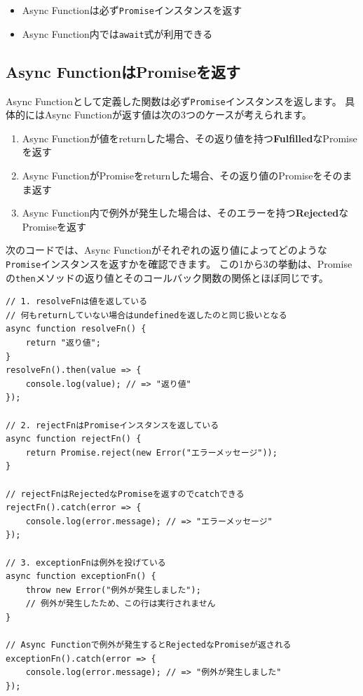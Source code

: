 \begin{itemize}
\item
  Async
  Functionは必ず\texttt{Promise}インスタンスを返す
\item
  Async Function内では\texttt{await}式が利用できる
\end{itemize}

\hypertarget{async-function-return-promise}{%
\subsection{Async
FunctionはPromiseを返す}\label{async-function-return-promise}}

Async
Functionとして定義した関数は必ず\texttt{Promise}インスタンスを返します。
具体的にはAsync Functionが返す値は次の3つのケースが考えられます。

\begin{enumerate}
\def\labelenumi{\arabic{enumi}.}
\item
  Async
  Functionが値をreturnした場合、その返り値を持つ\textbf{Fulfilled}なPromiseを返す
\item
  Async
  FunctionがPromiseをreturnした場合、その返り値のPromiseをそのまま返す
\item
  Async
  Function内で例外が発生した場合は、そのエラーを持つ\textbf{Rejected}なPromiseを返す
\end{enumerate}

次のコードでは、Async
Functionがそれぞれの返り値によってどのような\texttt{Promise}インスタンスを返すかを確認できます。
この1から3の挙動は、Promiseの\texttt{then}メソッドの返り値とそのコールバック関数の関係とほぼ同じです。

\begin{lstlisting}
// 1. resolveFnは値を返している
// 何もreturnしていない場合はundefinedを返したのと同じ扱いとなる
async function resolveFn() {
    return "返り値";
}
resolveFn().then(value => {
    console.log(value); // => "返り値"
});

// 2. rejectFnはPromiseインスタンスを返している
async function rejectFn() {
    return Promise.reject(new Error("エラーメッセージ"));
}

// rejectFnはRejectedなPromiseを返すのでcatchできる
rejectFn().catch(error => {
    console.log(error.message); // => "エラーメッセージ"
});

// 3. exceptionFnは例外を投げている
async function exceptionFn() {
    throw new Error("例外が発生しました");
    // 例外が発生したため、この行は実行されません
}

// Async Functionで例外が発生するとRejectedなPromiseが返される
exceptionFn().catch(error => {
    console.log(error.message); // => "例外が発生しました"
});
\end{lstlisting}

